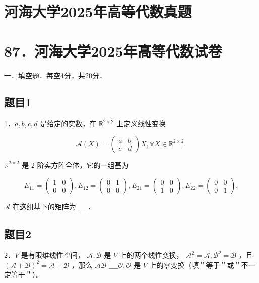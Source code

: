 \documentclass{article}
\begin{document}
\section*{河海大学2025年高等代数真题}
\section*{87．河海大学2025年高等代数试卷}
一．填空题．每空4分，共20分．\\

\subsection{题目1}
1．\(a, b, c, d\) 是给定的实数，在 \(\mathbb{R}^{2 \times 2}\) 上定义线性变换

\[
\mathcal{A}(X)=\left(\begin{array}{ll}
a & b \\
c & d
\end{array}\right) X, \forall X \in \mathbb{R}^{2 \times 2} .
\]

\(\mathbb{R}^{2 \times 2}\) 是 2 阶实方阵全体，它的一组基为

\[
E_{11}=\left(\begin{array}{ll}
1 & 0 \\
0 & 0
\end{array}\right), E_{12}=\left(\begin{array}{ll}
0 & 1 \\
0 & 0
\end{array}\right), E_{21}=\left(\begin{array}{ll}
0 & 0 \\
1 & 0
\end{array}\right), E_{22}=\left(\begin{array}{ll}
0 & 0 \\
0 & 1
\end{array}\right) .
\]

\(\mathcal{A}\) 在这组基下的矩阵为 \(\_\_\_\_\)．

\subsection{题目2}
2．\(V\) 是有限维线性空间， \(\mathcal{A}, \mathcal{B}\) 是 \(V\) 上的两个线性变换， \(\mathcal{A}^{2}=\mathcal{A}, \mathcal{B}^{2}=\mathcal{B}\) ，且 \((\mathcal{A}+\mathcal{B})^{2}=\mathcal{A}+\mathcal{B}\) ，那么 \(\mathcal{A} \mathcal{B}\) \(\_\_\_\_\)\(\mathcal{O}, \mathcal{O}\) 是 \(V\) 上的零变换（填＂等于＂或＂不一定等于＂）。
\end{document}
